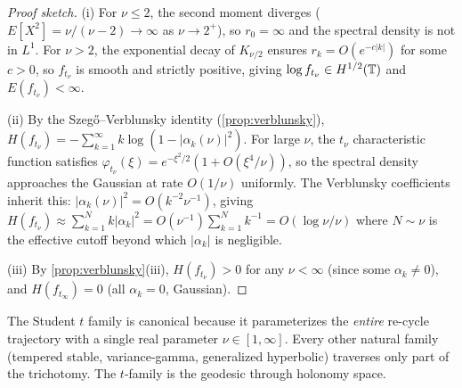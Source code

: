 \begin{proof}[Proof sketch]
(i) For $\nu \leq 2$, the second moment diverges ($E[X^2] = \nu/(\nu-2) \to \infty$ as $\nu \to 2^+$), so $r_0 = \infty$ and the spectral density is not in $L^1$. For $\nu > 2$, the exponential decay of $K_{\nu/2}$ ensures $r_k = O(e^{-c|k|})$ for some $c > 0$, so $f_{t_\nu}$ is smooth and strictly positive, giving $\log f_{t_\nu} \in H^{1/2}(\mathbb{T})$ and $E(f_{t_\nu}) < \infty$.

(ii) By the Szeg\H{o}--Verblunsky identity (\cref{prop:verblunsky}), $H(f_{t_\nu}) = -\sum_{k=1}^{\infty}k\log(1-|\alpha_k(\nu)|^2)$. For large $\nu$, the $t_\nu$ characteristic function satisfies $\varphi_{t_\nu}(\xi) = e^{-\xi^2/2}(1 + O(\xi^4/\nu))$, so the spectral density approaches the Gaussian at rate $O(1/\nu)$ uniformly. The Verblunsky coefficients inherit this: $|\alpha_k(\nu)|^2 = O(k^{-2}\nu^{-1})$, giving $H(f_{t_\nu}) \approx \sum_{k=1}^{N} k|\alpha_k|^2 = O(\nu^{-1})\sum_{k=1}^{N} k^{-1} = O(\log\nu/\nu)$ where $N \sim \nu$ is the effective cutoff beyond which $|\alpha_k|$ is negligible.

(iii) By \cref{prop:verblunsky}(iii), $H(f_{t_\nu}) > 0$ for any $\nu < \infty$ (since some $\alpha_k \neq 0$), and $H(f_{t_\infty}) = 0$ (all $\alpha_k = 0$, Gaussian).
\end{proof}

\begin{remark}[Canonicality]
The Student $t$ family is canonical because it parameterizes the \emph{entire} re-cycle trajectory with a single real parameter $\nu \in [1, \infty]$. Every other natural family (tempered stable, variance-gamma, generalized hyperbolic) traverses only part of the trichotomy. The $t$-family is the geodesic through holonomy space.
\end{remark}

